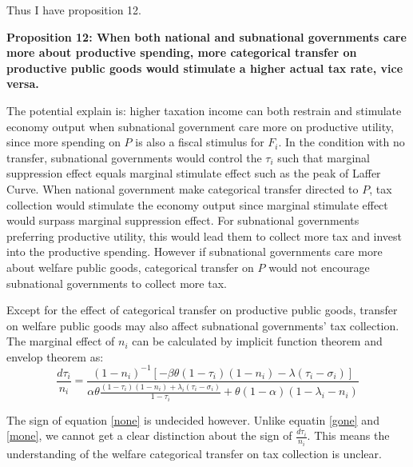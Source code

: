 Thus I have proposition 12.

\textbf{Proposition 12: When both national and subnational governments care more about productive spending, more categorical transfer on productive public goods would stimulate a higher actual tax rate, vice versa.}

The potential explain is: higher taxation income can both restrain and stimulate economy output when subnational government care more on productive utility, since more spending on $P$ is also a fiscal stimulus for $F_i$. In the condition with no transfer, subnational governments would control the $\tau_i$ such that marginal suppression effect equals marginal stimulate effect such as the peak of Laffer Curve\cite{laffer2004laffer}. When national government make categorical transfer directed to $P$, tax collection would stimulate the economy output since marginal stimulate effect would surpass marginal suppression effect. For subnational governments preferring productive utility, this would lead them to collect more tax and invest into the productive spending. However if subnational governments care more about welfare public goods, categorical transfer on $P$ would not encourage subnational governments to collect more tax.

Except for the effect of categorical transfer on productive public goods, transfer on welfare public goods may also affect subnational governments' tax collection. The marginal effect of $n_i$ can be calculated by implicit function theorem and envelop theorem as:
\begin{equation}
    \frac{d \tau_i}{n_i}=\frac{\left(1-n_i\right)^{-1}\left[-\beta \theta\left(1-\tau_i\right)\left(1-n_i\right)-\lambda\left(\tau_i-\sigma_i\right)\right]}{\alpha \theta \frac{\left(1-\tau_i\right)\left(1-n_i\right)+\lambda_i\left(\tau_i-\sigma_i\right)}{1-\tau_i}+\theta(1-\alpha)\left(1-\lambda_i-n_i\right)} \label{none}
\end{equation}

The sign of equation \ref{none} is undecided however. Unlike equatin \ref{gone} and \ref{mone}, we cannot get a clear distinction about the sign of $\frac{d \tau_i}{n_i}$. This means the understanding of the welfare categorical transfer on tax collection is unclear.



